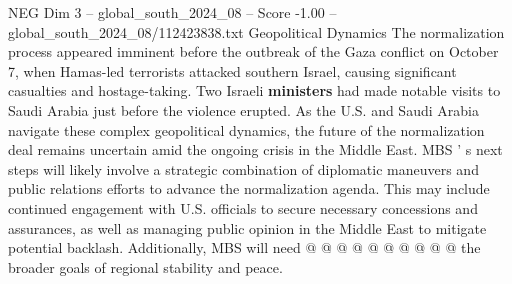 \begin{textsample}{NEG Dim 3 – global\_south\_2024\_08 – Score -1.00 – global\_south\_2024\_08/112423838.txt}
Geopolitical Dynamics The normalization process appeared imminent before the outbreak of the Gaza conflict on October 7, when Hamas-led terrorists attacked southern Israel, causing significant casualties and hostage-taking.
Two Israeli \textbf{ministers} had made notable visits to Saudi Arabia just before the violence erupted.
As the U.S. and Saudi Arabia navigate these complex geopolitical dynamics, the future of the normalization deal remains uncertain amid the ongoing crisis in the Middle East.
MBS ' s next steps will likely involve a strategic combination of diplomatic maneuvers and public relations efforts to advance the normalization agenda.
This may include continued engagement with U.S. officials to secure necessary concessions and assurances, as well as managing public opinion in the Middle East to mitigate potential backlash.
Additionally, MBS will need @ @ @ @ @ @ @ @ @ @ the broader goals of regional stability and peace.

\end{textsample}
